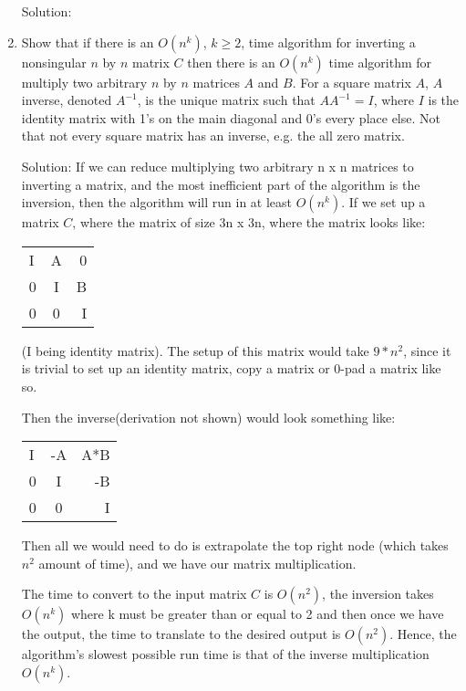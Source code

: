 \documentclass{article}
\begin{document}
\begin{enumerate}
Solution:

\item Show that if there is an $O(n^k)$, $k \ge 2$, time algorithm for inverting a nonsingular $n$ by $n$ matrix $C$
\newline then there is an $O(n^k)$ time algorithm for multiply two arbitrary $n$ by $n$ matrices $A$ and $B$.
\newline For a square matrix $A$, $A$ inverse, denoted $A^{-1}$, is the unique matrix such that $AA^{-1}= I$, where $I$ is 
\newline the identity matrix with 1's on the main diagonal and 0's every place else. Not that not every square
\newline matrix has an inverse, e.g. the all zero matrix.

Solution: If we can reduce multiplying two arbitrary n x n matrices to inverting a matrix, and the most inefficient part of the algorithm is the inversion, then the algorithm will run in at least $O(n^k)$. If we set up a matrix $C$, where the matrix of size 3n x 3n, where the matrix looks like:
\begin{tabular}{ |l  c  r |  }
I & A & 0  \\ 
0 & I & B  \\
0 & 0 & I  \\ 
\end{tabular}
(I being identity matrix). The setup of this matrix would take $9*n^2$, since it is trivial to set up an identity matrix, copy a matrix or 0-pad a matrix like so.

Then the inverse(derivation not shown) would look something like:
\begin{tabular}{ |l  c  r |  }
I & -A & A*B  \\ 
0 & I & -B  \\
0 & 0 & I  \\ 
\end{tabular}

Then all we would need to do is extrapolate the top right node (which takes $n^2$ amount of time), and we have our matrix multiplication.

The time to convert to the input matrix $C$ is $O(n^2)$, the inversion takes $O(n^k)$ where k must be greater than or equal to 2 and then once we have the output, the time to translate to the desired output is $O(n^2)$. Hence, the algorithm's slowest possible run time is that of the inverse multiplication $O(n^k)$.

\end{enumerate}
\end{document}
